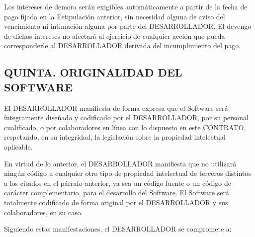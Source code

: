 \documentclass[a4paper,11pt]{report}
\begin{document}
	Los intereses de demora serán exigibles automáticamente a partir de la
	fecha de pago fijada en la Estipulación anterior, sin necesidad alguna
	de aviso del vencimiento ni intimación alguna por parte del
	DESARROLLADOR. El devengo de dichos intereses no afectará al ejercicio
	de cualquier acción que pueda corresponderle al DESARROLLADOR derivada
	del incumplimiento del pago.

	\subsection*{QUINTA. ORIGINALIDAD DEL SOFTWARE}

	El DESARROLLADOR manifiesta de forma expresa que el Software será
	íntegramente diseñado y codificado por el DESARROLLADOR, por su personal
	cualificado, o por colaboradores en línea con lo dispuesto en este
	CONTRATO, respetando, en su integridad, la legislación sobre la
	propiedad intelectual aplicable.

	En virtud de lo anterior, el DESARROLLADOR manifiesta que no utilizará
	ningún código u cualquier otro tipo de propiedad intelectual de terceros
	distintos a los citados en el párrafo anterior, ya sea un código fuente
	o un código de carácter complementario, para el desarrollo del Software.
	El Software será totalmente codificado de forma original por el
	DESARROLLADOR y sus colaboradores, en su caso.

	Siguiendo estas manifestaciones, el DESARROLLADOR se compromete a:
\end{document}
